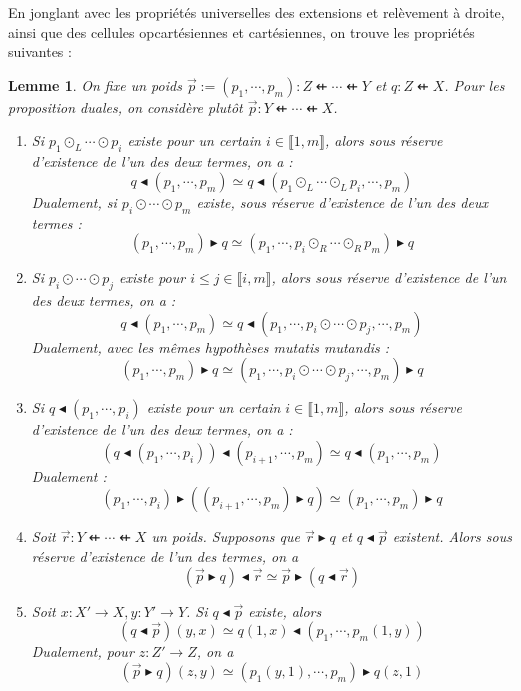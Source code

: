 \documentclass[8pt,a4paper,french,draft]{article}
\newcommand{\dfrom}{\nvleftarrow}
\newcommand{\iset}[1]{\llbracket #1 \rrbracket}
\newcommand{\rift}{\mathbin{\blacktriangleleft}}
\newcommand{\rext}{\mathbin{\blacktriangleright}}
\theoremstyle{plain}
\newtheorem{lemma}[theorem]{Lemme}
\theoremstyle{definition}
\theoremstyle{remark}
\begin{document}
En jonglant avec les propriétés universelles des extensions et relèvement à droite, ainsi que des cellules opcartésiennes et cartésiennes, on trouve les propriétés suivantes :

\begin{lemma}\label{lem:ext_lift}
    On fixe un poids $\vec{p} := (p_1, \cdots, p_m) : Z \dfrom \cdots \dfrom Y$ et $q : Z \dfrom X$. Pour les proposition duales, on considère plutôt $\vec{p} : Y \dfrom \cdots \dfrom X$.
    \begin{enumerate}[ref=\ref{lem:ext_lift} (\alph*)]
        \item \label{lem:ext_lift:stab_wcomp} Si $p_1 \odot_L \cdots \odot p_i$ existe pour un certain $i\in\iset{1, m}$, alors sous réserve d'existence de l'un des deux termes, on a :
            $$q \rift (p_1, \cdots, p_m) \simeq q \rift (p_1 \odot_L \cdots \odot_L p_i ,\cdots, p_m)$$
            Dualement, si $p_i \odot \cdots \odot p_m$ existe, sous réserve d'existence de l'un des deux termes :
            $$(p_1, \cdots, p_m) \rext q \simeq (p_1, \cdots, p_i \odot_R \cdots \odot_R p_m) \rext q$$
        \item \label{lem:ext_lift:stab_comp} Si $p_i \odot \cdots \odot p_j$ existe pour $i \leq j \in \iset{i, m}$, alors sous réserve d'existence de l'un des deux termes, on a :
            $$q \rift (p_1, \cdots, p_m) \simeq q \rift (p_1, \cdots, p_i \odot \cdots \odot p_j, \cdots, p_m)$$
            Dualement, avec les mêmes hypothèses mutatis mutandis :
            $$(p_1, \cdots, p_m) \rext q \simeq (p_1, \cdots, p_i \odot \cdots \odot p_j, \cdots, p_m) \rext q$$
        \item \label{lem:ext_lift:stab_split} Si $q \rift (p_1, \cdots, p_i)$ existe pour un certain $i\in\iset{1, m}$, alors sous réserve d'existence de l'un des deux termes, on a :
            $$(q \rift (p_1, \cdots, p_i)) \rift (p_{i+1}, \cdots, p_m) \simeq q \rift(p_1, \cdots, p_m)$$
            Dualement :
            $$(p_1, \cdots, p_i) \rext ((p_{i+1}, \cdots, p_m) \rext q) \simeq (p_1, \cdots, p_m) \rext q$$
        \item \label{lem:ext_lift:assoc_rift_rext} Soit $\vec{r} : Y \dfrom \cdots \dfrom X$ un poids. Supposons que $\vec{r} \rext q$ et $q \rift \vec{p}$ existent. Alors sous réserve d'existence de l'un des termes, on a
            $$(\vec{p} \rext q) \rift \vec{r} \simeq \vec{p} \rext (q \rift \vec{r})$$
        \item \label{lem:ext_lift:res} Soit $x : X' \to X, y : Y' \to Y$. Si $q \rift \vec{p}$ existe, alors
            $$(q \rift \vec{p})(y, x) \simeq q(1, x) \rift (p_1, \cdots, p_m(1, y))$$
            Dualement, pour $z : Z' \to Z$, on a
            $$(\vec{p} \rext q)(z, y) \simeq (p_1(y, 1), \cdots, p_m)\rext q(z, 1)$$
    \end{enumerate}
\end{lemma}
\end{document}
